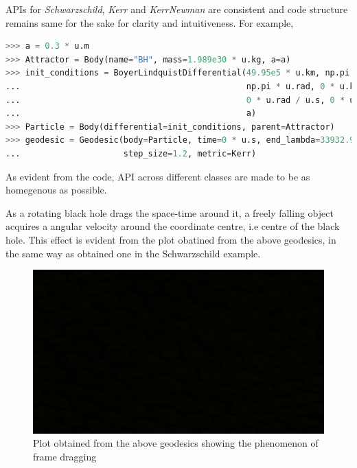 \documentclass{aastex63}
\begin{document}
APIs for \textit{Schwarzschild}, \textit{Kerr} and \textit{KerrNewman} are consistent and code structure remains same for the sake for clarity and intuitiveness. For example,

\begin{lstlisting}[language=Python, caption=Defining the Kerr Body and the particle and calculating geodesics]
>>> a = 0.3 * u.m
>>> Attractor = Body(name="BH", mass=1.989e30 * u.kg, a=a)
>>> init_conditions = BoyerLindquistDifferential(49.95e5 * u.km, np.pi / 2 * u.rad, 
...                                              np.pi * u.rad, 0 * u.km / u.s, 
...                                              0 * u.rad / u.s, 0 * u.rad / u.s,
...                                              a)
>>> Particle = Body(differential=init_conditions, parent=Attractor)
>>> geodesic = Geodesic(body=Particle, time=0 * u.s, end_lambda=33932.90,
...                     step_size=1.2, metric=Kerr)
\end{lstlisting}

As evident from the code, API across different classes are made to be as homegenous as possible.

As a rotating black hole drags the space-time around it, a freely falling object acquires a angular velocity around the coordinate centre, i.e centre of the black hole. This effect is evident from the plot obatined from the above geodesics, in the same way as obtained one in the Schwarzschild example.

\begin{figure}[h]
	\centering
	\includegraphics[scale=0.1]{images/blank.jpg} %
	\caption{Plot obtained from the above geodesics showing the phenomenon of frame dragging}
	\label{fig:kerr}
\end{figure}
\end{document}
